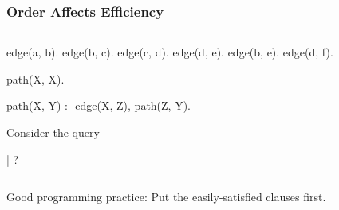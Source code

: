 \documentclass{plt}
\begin{document}
\begin{frame}[t,fragile]
  \frametitle{Order Affects Efficiency}

\begin{columns}
  \begin{column}[t]{0.4\textwidth}

\begin{prolog}
edge(a, b). edge(b, c).
edge(c, d). edge(d, e).
edge(b, e). edge(d, f).

path(X, X).

path(X, Y) :-
    edge(X, Z), path(Z, Y).
\end{prolog}

Consider the query

\begin{interactive}
| ?- 
\end{interactive}
  \end{column}
\begin{column}[t]{0.5\textwidth}


\end{column}
\end{columns}

Good programming practice: Put the easily-satisfied clauses first.

\end{frame}
\end{document}

